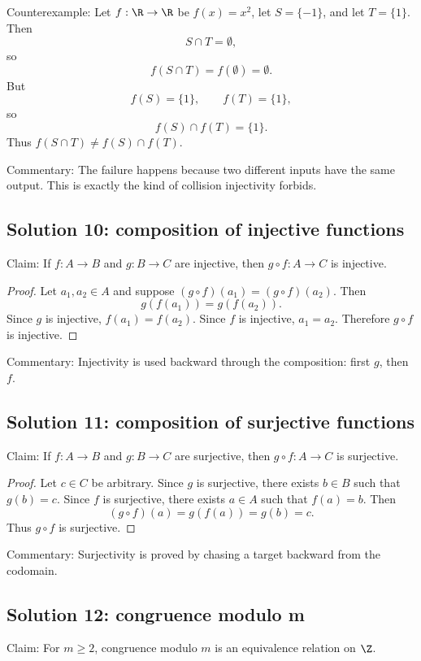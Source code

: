 Counterexample: Let $f:\R\to\R$ be $f(x)=x^2$, let $S=\{-1\}$, and let $T=\{1\}$. Then
\[
S\cap T=\emptyset,
\]
so
\[
f(S\cap T)=f(\emptyset)=\emptyset.
\]
But
\[
f(S)=\{1\},\qquad f(T)=\{1\},
\]
so
\[
f(S)\cap f(T)=\{1\}.
\]
Thus $f(S\cap T)\neq f(S)\cap f(T)$.

Commentary: The failure happens because two different inputs have the same output. This is exactly the kind of collision injectivity forbids.

\subsection{Solution 10: composition of injective functions}

Claim: If $f:A\to B$ and $g:B\to C$ are injective, then $g\circ f:A\to C$ is injective.

\begin{proof}
Let $a_1,a_2\in A$ and suppose $(g\circ f)(a_1)=(g\circ f)(a_2)$. Then
\[
g(f(a_1))=g(f(a_2)).
\]
Since $g$ is injective, $f(a_1)=f(a_2)$. Since $f$ is injective, $a_1=a_2$. Therefore $g\circ f$ is injective.
\end{proof}

Commentary: Injectivity is used backward through the composition: first $g$, then $f$.

\subsection{Solution 11: composition of surjective functions}

Claim: If $f:A\to B$ and $g:B\to C$ are surjective, then $g\circ f:A\to C$ is surjective.

\begin{proof}
Let $c\in C$ be arbitrary. Since $g$ is surjective, there exists $b\in B$ such that $g(b)=c$. Since $f$ is surjective, there exists $a\in A$ such that $f(a)=b$. Then
\[
(g\circ f)(a)=g(f(a))=g(b)=c.
\]
Thus $g\circ f$ is surjective.
\end{proof}

Commentary: Surjectivity is proved by chasing a target backward from the codomain.

\subsection{Solution 12: congruence modulo m}

Claim: For $m\geq2$, congruence modulo $m$ is an equivalence relation on $\Z$.


